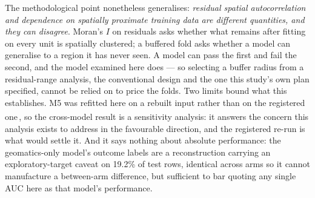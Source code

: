\documentclass[11pt,a4paper]{article}
\providecommand{\REBUILD}{\textsuperscript{\ddag}}
\begin{document}
The methodological point nonetheless generalises: \emph{residual spatial autocorrelation and dependence on spatially proximate training data are different quantities, and they can disagree}. Moran's $I$ on residuals asks whether what remains after fitting on every unit is spatially clustered; a buffered fold asks whether a model can generalise to a region it has never seen. A model can pass the first and fail the second, and the model examined here does --- so selecting a buffer radius from a residual-range analysis, the conventional design and the one this study's own plan specified, cannot be relied on to price the folds. Two limits bound what this establishes. M5 was refitted here on a rebuilt input rather than on the registered one\,\REBUILD, so the cross-model result is a sensitivity analysis: it answers the concern this analysis exists to address in the favourable direction, and the registered re-run is what would settle it. And it says nothing about absolute performance: the geomatics-only model's outcome labels are a reconstruction carrying an exploratory-target caveat on 19.2\% of test rows, identical across arms so it cannot manufacture a between-arm difference, but sufficient to bar quoting any single AUC here as that model's performance.
\end{document}
